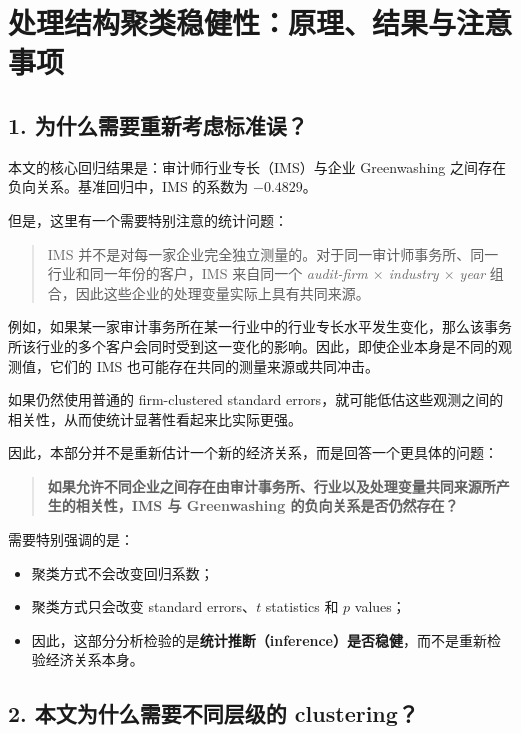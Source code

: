 \documentclass[11pt]{article}
\begin{document}
\section{处理结构聚类稳健性：原理、结果与注意事项}

\subsection{1. 为什么需要重新考虑标准误？}

本文的核心回归结果是：审计师行业专长（IMS）与企业 Greenwashing 之间存在负向关系。基准回归中，IMS 的系数为 $-0.4829$。

但是，这里有一个需要特别注意的统计问题：

\begin{quote}
IMS 并不是对每一家企业完全独立测量的。对于同一审计师事务所、同一行业和同一年份的客户，IMS 来自同一个
\textit{audit-firm $\times$ industry $\times$ year}
组合，因此这些企业的处理变量实际上具有共同来源。
\end{quote}

例如，如果某一家审计事务所在某一行业中的行业专长水平发生变化，那么该事务所该行业的多个客户会同时受到这一变化的影响。因此，即使企业本身是不同的观测值，它们的 IMS 也可能存在共同的测量来源或共同冲击。

如果仍然使用普通的 firm-clustered standard errors，就可能低估这些观测之间的相关性，从而使统计显著性看起来比实际更强。

因此，本部分并不是重新估计一个新的经济关系，而是回答一个更具体的问题：

\begin{quote}
\textbf{如果允许不同企业之间存在由审计事务所、行业以及处理变量共同来源所产生的相关性，IMS 与 Greenwashing 的负向关系是否仍然存在？}
\end{quote}

需要特别强调的是：

\begin{itemize}
    \item 聚类方式不会改变回归系数；
    \item 聚类方式只会改变 standard errors、$t$ statistics 和 $p$ values；
    \item 因此，这部分分析检验的是\textbf{统计推断（inference）是否稳健}，而不是重新检验经济关系本身。
\end{itemize}

\subsection{2. 本文为什么需要不同层级的 clustering？}
\end{document}
